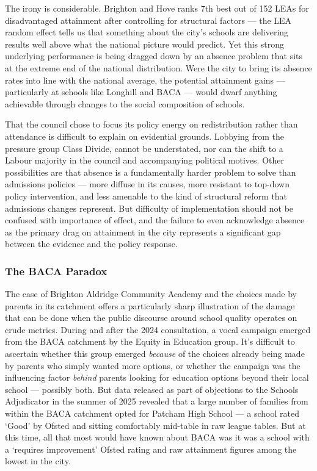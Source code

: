\documentclass[
  11pt,
]{article}
\begin{document}
The irony is considerable. Brighton and Hove ranks 7th best out of 152
LEAs for disadvantaged attainment after controlling for structural
factors --- the LEA random effect tells us that something about the
city's schools are delivering results well above what the national
picture would predict. Yet this strong underlying performance is being
dragged down by an absence problem that sits at the extreme end of the
national distribution. Were the city to bring its absence rates into
line with the national average, the potential attainment gains ---
particularly at schools like Longhill and BACA --- would dwarf anything
achievable through changes to the social composition of schools.

That the council chose to focus its policy energy on redistribution
rather than attendance is difficult to explain on evidential grounds.
Lobbying from the pressure group Class Divide, cannot be understated,
nor can the shift to a Labour majority in the council and accompanying
political motives. Other possibilities are that absence is a
fundamentally harder problem to solve than admissions policies --- more
diffuse in its causes, more resistant to top-down policy intervention,
and less amenable to the kind of structural reform that admissions
changes represent. But difficulty of implementation should not be
confused with importance of effect, and the failure to even acknowledge
absence as the primary drag on attainment in the city represents a
significant gap between the evidence and the policy response.

\subsubsection{The BACA Paradox}\label{the-baca-paradox}

The case of Brighton Aldridge Community Academy and the choices made by
parents in its catchment offers a particularly sharp illustration of the
damage that can be done when the public discourse around school quality
operates on crude metrics. During and after the 2024 consultation, a
vocal campaign emerged from the BACA catchment by the Equity in
Education group. It's difficult to ascertain whether this group emerged
\emph{because} of the choices already being made by parents who simply
wanted more options, or whether the campaign was the influencing factor
\emph{behind} parents looking for education options beyond their local
school --- possibly both. But data released as part of objections to the
Schools Adjudicator in the summer of 2025 revealed that a large number
of families from within the BACA catchment opted for Patcham High School
--- a school rated `Good' by Ofsted and sitting comfortably mid-table in
raw league tables. But at this time, all that most would have known
about BACA was it was a school with a `requires improvement' Ofsted
rating and raw attainment figures among the lowest in the city.
\end{document}
